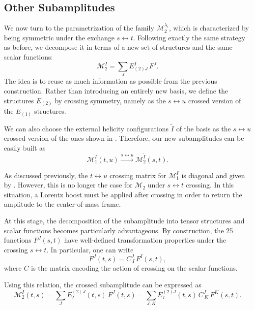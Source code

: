 \subsection{Other Subamplitudes}
We now turn to the parametrization of the family $\mathcal{M}_2^{\lambda_i}$, which is characterized by being symmetric under the exchange $s \leftrightarrow t$. Following exactly the same strategy as before, we decompose it in terms of a new set of structures and the same scalar functions:
\begin{equation}
\mathcal{M}_2^{I} = \sum_{J} E_{(2)J}^I \, F^J.
\end{equation}
The idea is to reuse as much information as possible from the previous construction. Rather than introducing an entirely new basis, we define the structures $E_{(2)}$ by crossing symmetry, namely as the $s \leftrightarrow u$ crossed version of the $E_{(1)}$ structures. 

We can also choose the external helicity configurations $\tilde{I}$ of the basis as the $s \leftrightarrow u$ crossed version of the ones shown in . Therefore, our new subamplitudes can be easily built as
\begin{equation}
    \mathcal{M}_1^I (t, u) \xrightarrow{s \leftrightarrow u} \mathcal{M}_2^{\tilde{I}}(s, t).
\end{equation}

As discussed previously, the \( t \leftrightarrow u \) crossing matrix for \( \mathcal{M}_1^I \) is diagonal and given by . However, this is no longer the case for \( \mathcal{M}_2 \) under \( s \leftrightarrow t \) crossing. In this situation, a Lorentz boost must be applied after crossing in order to return the amplitude to the center-of-mass frame.  

At this stage, the decomposition of the subamplitude into tensor structures and scalar functions becomes particularly advantageous. By construction, the 25 functions \( F^J(s,t) \) have well-defined transformation properties under the crossing \( s \leftrightarrow t \). In particular, one can write
\begin{equation}
    F^J(t,s) = C^J_{\ I}\, F^I(s,t),
\end{equation}
where \( C \) is the matrix encoding the action of crossing on the scalar functions.

Using this relation, the crossed subamplitude can be expressed as
\begin{equation}
    \mathcal{M}_2^I(t, s) = \sum_J E_{I}^{(2) J}(t, s)\, F^J(t, s)
    = \sum_{J,K} E_{I}^{(2) J}(t, s)\, C^J_{\ K}\, F^K(s,t).
\end{equation}

